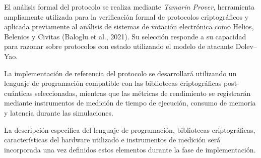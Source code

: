 El análisis formal del protocolo se realiza mediante \textit{Tamarin Prover}, herramienta ampliamente utilizada para la verificación formal de protocolos criptográficos y aplicada previamente al análisis de sistemas de votación electrónica como Helios, Belenios y Civitas (Baloglu et al., 2021). Su selección responde a su capacidad para razonar sobre protocolos con estado utilizando el modelo de atacante Dolev--Yao.

La implementación de referencia del protocolo se desarrollará utilizando un lenguaje de programación compatible con las bibliotecas criptográficas post-cuánticas seleccionadas, mientras que las métricas de rendimiento se registrarán mediante instrumentos de medición de tiempo de ejecución, consumo de memoria y latencia durante las simulaciones.

La descripción específica del lenguaje de programación, bibliotecas criptográficas, características del hardware utilizado e instrumentos de medición será incorporada una vez definidos estos elementos durante la fase de implementación.
